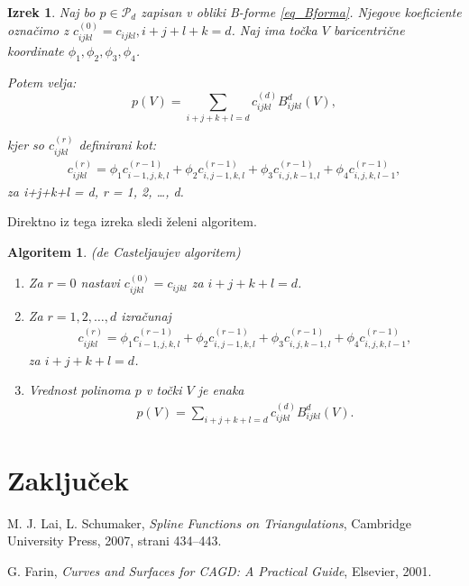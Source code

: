 \documentclass[11pt,a4paper]{article}
\newtheorem{theorem}{Izrek}
\newtheorem{algorithm}{Algoritem}
\begin{document}
\begin{theorem}
    Naj bo $p \in \mathcal{P}_d$ zapisan v obliki B-forme \eqref{eq_Bforma}. Njegove koeficiente označimo z $c_{ijkl}^{(0)} = c_{ijkl}, i+j+l+k = d$.
    Naj ima točka $V$ baricentrične koordinate $\phi_1, \phi_2, \phi_3, \phi_4$.

    Potem velja:
    $$
    p(V) = \sum_{i+j+k+l = d} c_{ijkl}^{(d)} B_{ijkl}^d(V),
    $$

    kjer so  $c_{ijkl}^{(r)}$ definirani kot:
    \begin{align*}
        c_{ijkl}^{(r)} = \phi_1 c_{i-1,j,k,l}^{(r-1)} + \phi_2 c_{i,j-1,k,l}^{(r-1)} + \phi_3 c_{i,j,k-1,l}^{(r-1)} + \phi_4 c_{i,j,k,l-1}^{(r-1)},
    \end{align*}
    za i+j+k+l = d, r = 1, 2, \ldots, d.
\end{theorem}

Direktno iz tega izreka sledi želeni algoritem.

\begin{algorithm}{(de Casteljaujev algoritem)}
    \begin{enumerate}
        \item Za $r = 0$ nastavi $c_{ijkl}^{(0)} = c_{ijkl}$ za $i+j+k+l = d$.
        \item Za $r = 1, 2, \ldots, d$ izračunaj
        \begin{align*}
            c_{ijkl}^{(r)} = \phi_1 c_{i-1,j,k,l}^{(r-1)} + \phi_2 c_{i,j-1,k,l}^{(r-1)} + \phi_3 c_{i,j,k-1,l}^{(r-1)} + \phi_4 c_{i,j,k,l-1}^{(r-1)},
        \end{align*}
        za $i+j+k+l = d$.
        \item Vrednost polinoma $p$ v točki $V$ je enaka
        \begin{align*}
            p(V) = \sum_{i+j+k+l = d} c_{ijkl}^{(d)} B_{ijkl}^d(V).
        \end{align*}
    \end{enumerate}
\end{algorithm}

\section{Zaključek}



\begin{thebibliography}{99}

    M. J. Lai, L. Schumaker, \textit{Spline Functions on Triangulations}, 
    Cambridge University Press, 2007, strani 434–443.

    G. Farin, \textit{Curves and Surfaces for CAGD: A Practical Guide}, 
    Elsevier, 2001.

\end{thebibliography}
\end{document}
